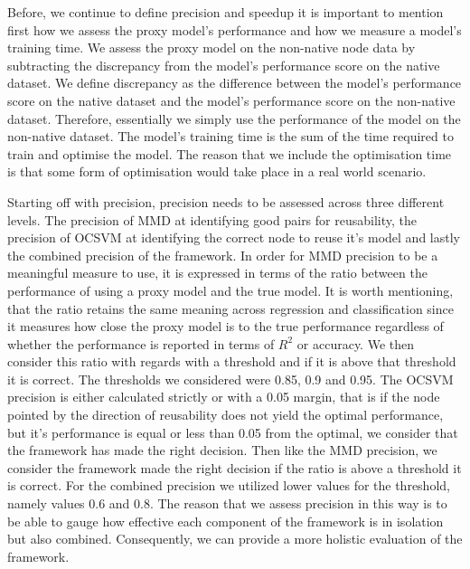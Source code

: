 \documentclass{mpaper}
\begin{document}
Before, we continue to define precision and speedup it is important to mention first how we assess the proxy model's performance and how we measure a model's training time. We assess the proxy model on the non-native node data by subtracting the discrepancy from the model's performance score on the native dataset. We define discrepancy as the difference between the model's performance score on the native dataset and the model's performance score on the non-native dataset. Therefore, essentially we simply use the performance of the model on the non-native dataset. The model's training time is the sum of the time required to train and optimise the model. The reason that we include the optimisation time is that some form of optimisation would take place in a real world scenario.

Starting off with precision, precision needs to be assessed across three different levels. The precision of MMD at identifying good pairs for reusability, the precision of OCSVM at identifying the correct node to reuse it's model and lastly the combined precision of the framework. In order for MMD precision to be a meaningful measure to use, it is expressed in terms of the ratio between the performance of using a proxy model and the true model. It is worth mentioning, that the ratio retains the same meaning across regression and classification since it measures how close the proxy model is to the true performance regardless of whether the performance is reported in terms of $R^2$ or accuracy. We then consider this ratio with regards with a threshold and if it is above that threshold it is correct. The thresholds we considered were 0.85, 0.9 and 0.95. The OCSVM precision is either calculated strictly or with a 0.05 margin, that is if the node pointed by the direction of reusability does not yield the optimal performance, but it's performance is equal or less than 0.05 from the optimal, we consider that the framework has made the right decision. Then like the MMD precision, we consider the framework made the right decision if the ratio is above a threshold it is correct. For the combined precision we utilized lower values for the threshold, namely values 0.6 and 0.8. The reason that we assess precision in this way is to be able to gauge how effective each component of the framework is in isolation but also combined. Consequently, we can provide a more holistic evaluation of the framework. 
\end{document}
